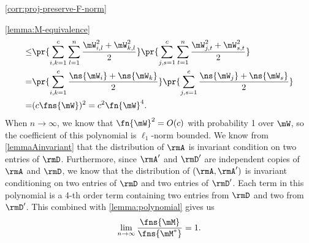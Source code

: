 \begin{proofof}{\cref{corr:proj-preserve-F-norm}}
\begin{proofof}{\cref{lemma:M-equivalence}}
\begin{equation}
\begin{split}
    \leq &\pr{\sum_{i,k=1}^c\sum_{l=1}^n\frac{\mW_{i,l}^2+\mW_{k,l}^2}{2}}\pr{\sum_{j,s=1}^c\sum_{t=1}^n\frac{\mW_{j,t}^2+\mW_{s,t}^2}{2}}\\
    =    &\pr{\sum_{i,k=1}^c\frac{\ns{\mW_i}+\ns{\mW_k}}{2}}\pr{\sum_{j,s=1}^c\frac{\ns{\mW_j}+\ns{\mW_s}}{2}}\\
    =    &(c\fns{\mW})^2=c^2\fn{\mW}^4.
\end{split}
\end{equation}
When $n\to\infty$, we know that $\fn{\mW}^2=O(c)$ with probability 1 over $\mW$, so the coefficient of this polynomial is $\ell_1$-norm bounded. We know from \cref{lemmaAinvariant} that the distribution of $\rmA$ is invariant condition on two entries of $\rmD$. Furthermore, since $\rmA'$ and $\rmD'$ are independent copies of $\rmA$ and $\rmD$, we know that the distribution of $(\rmA,\rmA')$ is invariant conditioning on two entries of $\rmD$ and two entries of $\rmD'$. Each term in this polynomial is a 4-th order term containing two entries from $\rmD$ and two from $\rmD'$. This combined with \cref{lemma:polynomial} gives us
\begin{equation}
    \lim_{n\to\infty}\frac{\fns{\mM}}{\fns{\mM^*}}=1.
\end{equation}

\end{proofof}


\end{proofof}
